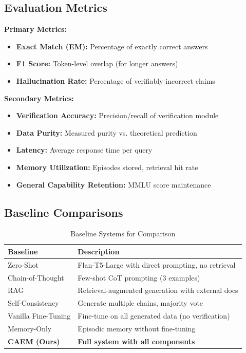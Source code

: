 \documentclass[12pt,a4paper]{article}
\theoremstyle{definition}
\begin{document}
\subsection{Evaluation Metrics}

\textbf{Primary Metrics:}
\begin{itemize}
    \item \textbf{Exact Match (EM):} Percentage of exactly correct answers
    \item \textbf{F1 Score:} Token-level overlap (for longer answers)
    \item \textbf{Hallucination Rate:} Percentage of verifiably incorrect claims
\end{itemize}

\textbf{Secondary Metrics:}
\begin{itemize}
    \item \textbf{Verification Accuracy:} Precision/recall of verification module
    \item \textbf{Data Purity:} Measured purity vs. theoretical prediction
    \item \textbf{Latency:} Average response time per query
    \item \textbf{Memory Utilization:} Episodes stored, retrieval hit rate
    \item \textbf{General Capability Retention:} MMLU score maintenance
\end{itemize}

\subsection{Baseline Comparisons}

\begin{table}[htbp]
\centering
\caption{Baseline Systems for Comparison}
\begin{tabular}{lp{8cm}}
\toprule
\textbf{Baseline} & \textbf{Description} \\
\midrule
Zero-Shot & Flan-T5-Large with direct prompting, no retrieval \\
Chain-of-Thought & Few-shot CoT prompting (3 examples) \\
RAG & Retrieval-augmented generation with external docs \\
Self-Consistency & Generate multiple chains, majority vote \\
Vanilla Fine-Tuning & Fine-tune on all generated data (no verification) \\
Memory-Only & Episodic memory without fine-tuning \\
\midrule
\textbf{CAEM (Ours)} & \textbf{Full system with all components} \\
\bottomrule
\end{tabular}
\end{table}
\end{document}
